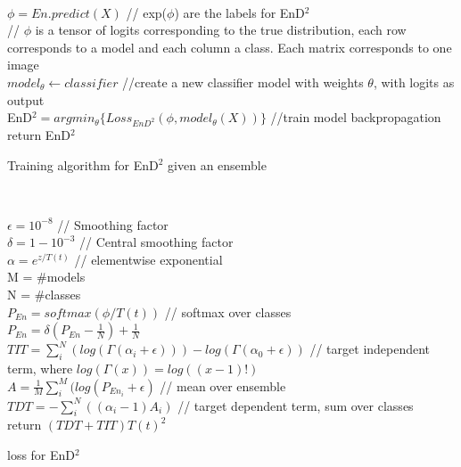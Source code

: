 \begin{algorithm}
     \\
    $\phi = En.predict(X)$ // exp($\phi$) are the labels for EnD$^2$  \\
    // $\phi$ is a tensor of logits corresponding to the true distribution, each row corresponds to a model and each column a class. Each matrix corresponds to one image \\
    $model_{\theta} \leftarrow classifier$ //create a new classifier model with weights $\theta$, with logits as output \\
    EnD$^2 = argmin_{\theta}\{Loss_{EnD^2}(\phi,model_{\theta}(X)) \}$ //train model backpropagation\\
    return EnD$^2$
    \caption{Training algorithm for EnD$^2$ given an ensemble}
    \label{alg:training}
    
\end{algorithm} \\
\begin{algorithm}
    $\epsilon = 10^{-8}$  // Smoothing factor\\
    $\delta = 1-10^{-3}$ // Central smoothing factor\\
    
    $\alpha = e^{z/T(t)}$ // elementwise exponential\\
    M = \#models \\
    N = \#classes \\
    $P_{En} = softmax(\phi/T(t))$ // softmax over classes\\
    $P_{En} = \delta(P_{En} - \frac{1}{N}) + \frac{1}{N}$\\
    $TIT = \sum_i^N(log(\Gamma(\alpha_i + \epsilon))) - log(\Gamma(
            \alpha_0 + \epsilon))  $ // target independent term, where $log(\Gamma(x)) = log((x - 1)!)$\\
    $A = \frac{1}{M}\sum^{M}_i(log(P_{En_i} + \epsilon)$ // mean over ensemble\\
    $TDT = -\sum_i^{N}((\alpha_i - 1) A_i)$  // target dependent term, sum over classes \\

    return $(TDT +TIT) T(t)^2$
    
    
    \label{alg:loss}
    \caption{loss for EnD$^2$}
    

\end{algorithm} 
\\




